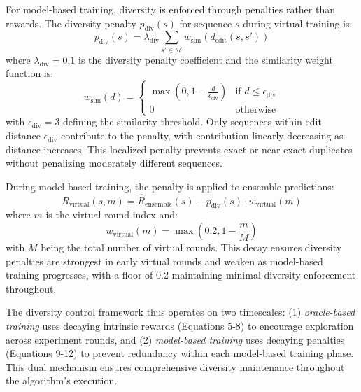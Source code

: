 For model-based training, diversity is enforced through penalties rather than rewards. The diversity penalty $p_{\text{div}}(s)$ for sequence $s$ during virtual training is:
%
\begin{equation}
p_{\text{div}}(s) = \lambda_{\text{div}} \sum_{s' \in \mathcal{H}} w_{\text{sim}}(d_{\text{edit}}(s, s'))
\end{equation}
%
where $\lambda_{\text{div}} = 0.1$ is the diversity penalty coefficient and the similarity weight function is:
%
\begin{equation}
w_{\text{sim}}(d) = \begin{cases}
\max\left(0, 1 - \frac{d}{\epsilon_{\text{div}}}\right) & \text{if } d \leq \epsilon_{\text{div}} \\
0 & \text{otherwise}
\end{cases}
\end{equation}
%
with $\epsilon_{\text{div}} = 3$ defining the similarity threshold. Only sequences within edit distance $\epsilon_{\text{div}}$ contribute to the penalty, with contribution linearly decreasing as distance increases. This localized penalty prevents exact or near-exact duplicates without penalizing moderately different sequences.

During model-based training, the penalty is applied to ensemble predictions:
%
\begin{equation}
R_{\text{virtual}}(s, m) = \hat{R}_{\text{ensemble}}(s) - p_{\text{div}}(s) \cdot w_{\text{virtual}}(m)
\end{equation}
%
where $m$ is the virtual round index and:
%
\begin{equation}
w_{\text{virtual}}(m) = \max\left(0.2, 1 - \frac{m}{M}\right)
\end{equation}
%
with $M$ being the total number of virtual rounds. This decay ensures diversity penalties are strongest in early virtual rounds and weaken as model-based training progresses, with a floor of 0.2 maintaining minimal diversity enforcement throughout.

The diversity control framework thus operates on two timescales: (1) \emph{oracle-based training} uses decaying intrinsic rewards (Equations 5-8) to encourage exploration across experiment rounds, and (2) \emph{model-based training} uses decaying penalties (Equations 9-12) to prevent redundancy within each model-based training phase. This dual mechanism ensures comprehensive diversity maintenance throughout the algorithm's execution.
